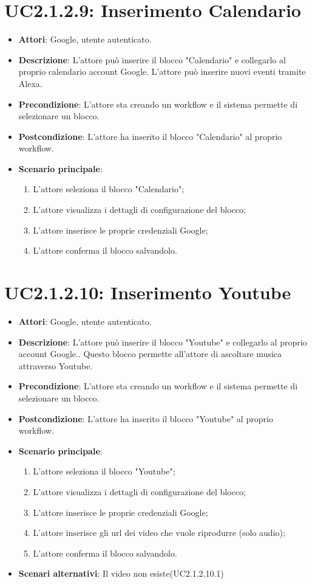 \section{UC2.1.2.9: Inserimento Calendario}
\label{UC2.1.2.9}
\begin{itemize}
	\item \textbf{Attori}: Google, utente autenticato.
	\item \textbf{Descrizione}: L'attore può inserire il blocco "Calendario" e collegarlo al proprio calendario account Google. L'attore può inserire nuovi eventi tramite Alexa.
	\item \textbf{Precondizione}: L'attore sta creando un workflow e il sistema permette di selezionare un blocco.
	\item \textbf{Postcondizione}: L'attore ha inserito il blocco "Calendario" al proprio workflow.
	\item \textbf{Scenario principale}:
	\begin{enumerate} \item L'attore seleziona il blocco "Calendario"; \item L'attore visualizza i dettagli di configurazione del blocco; \item  L'attore inserisce le proprie credenziali Google; \item L'attore conferma il blocco salvandolo.\end{enumerate}
\end{itemize}

\section{UC2.1.2.10: Inserimento Youtube}
\label{UC2.1.2.10}
\begin{itemize}
	\item \textbf{Attori}: Google, utente autenticato.
	\item \textbf{Descrizione}: L'attore può inserire il blocco "Youtube" e collegarlo al proprio account Google.. Questo blocco permette all'attore di ascoltare musica attraverso Youtube.
	\item \textbf{Precondizione}: L'attore sta creando un workflow e il sistema permette di selezionare un blocco.
	\item \textbf{Postcondizione}: L'attore ha inserito il blocco "Youtube" al proprio workflow.
	\item \textbf{Scenario principale}:
	\begin{enumerate} \item L'attore seleziona il blocco "Youtube";  \item L'attore visualizza i dettagli di configurazione del blocco; \item  L'attore inserisce le proprie credenziali Google;  \item  L'attore inserisce gli url dei video che vuole riprodurre (solo audio); \item L'attore conferma il blocco salvandolo.\end{enumerate}
	\item \textbf{Scenari alternativi}:
	Il video non esiste(UC2.1.2.10.1)
\end{itemize}


